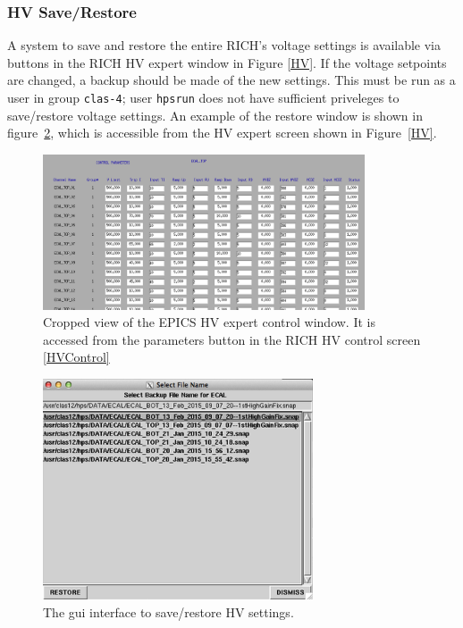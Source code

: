 \documentclass[12pt]{article}
\begin{document}

    
      \subsubsection{HV Save/Restore}
      A system to save and restore the entire RICH's voltage settings is available via buttons in the RICH HV expert window in Figure \ref{HV}.  If the voltage setpoints are changed, a backup should be made of the new settings.  This must be run as a user in group \texttt{clas-4};  user \texttt{hpsrun} does not have sufficient priveleges to save/restore voltage settings. 
      An example of the restore window is shown in figure~\ref{fig:hvrestore}, which is accessible from the HV expert screen shown in Figure~\ref{HV}.

\begin{figure}[htbp] \centering
\includegraphics[width=0.85\textwidth]{pics/ecalhv_parameters_2014_12_15.png}
\caption{ \label{EHV} Cropped view of the EPICS HV expert control window. It is accessed from the parameters button in the RICH HV control screen \ref{HVControl}}
\end{figure}

\begin{figure}[htbp]\centering
    \includegraphics[width=8cm]{pics/hvrestore.png}
    \caption{The gui interface to save/restore HV settings.  \label{fig:hvrestore}}
\end{figure}
\end{document}
